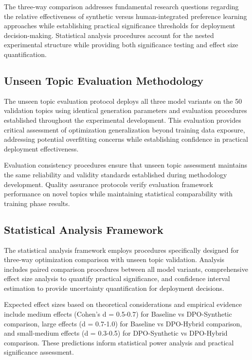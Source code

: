 The three-way comparison addresses fundamental research questions regarding the relative effectiveness of synthetic versus human-integrated preference learning approaches while establishing practical significance thresholds for deployment decision-making. Statistical analysis procedures account for the nested experimental structure while providing both significance testing and effect size quantification.

\subsection{Unseen Topic Evaluation Methodology}

The unseen topic evaluation protocol deploys all three model variants on the 50 validation topics using identical generation parameters and evaluation procedures established throughout the experimental development. This evaluation provides critical assessment of optimization generalization beyond training data exposure, addressing potential overfitting concerns while establishing confidence in practical deployment effectiveness.

Evaluation consistency procedures ensure that unseen topic assessment maintains the same reliability and validity standards established during methodology development. Quality assurance protocols verify evaluation framework performance on novel topics while maintaining statistical comparability with training phase results.

\subsection{Statistical Analysis Framework}

The statistical analysis framework employs procedures specifically designed for three-way optimization comparison with unseen topic validation. Analysis includes paired comparison procedures between all model variants, comprehensive effect size analysis to quantify practical significance, and confidence interval estimation to provide uncertainty quantification for deployment decisions.

Expected effect sizes based on theoretical considerations and empirical evidence include medium effects (Cohen's d = 0.5-0.7) for Baseline vs DPO-Synthetic comparison, large effects (d = 0.7-1.0) for Baseline vs DPO-Hybrid comparison, and small-medium effects (d = 0.3-0.5) for DPO-Synthetic vs DPO-Hybrid comparison. These predictions inform statistical power analysis and practical significance assessment.

